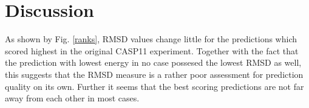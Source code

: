 \documentclass[11pt,a4paper]{article}
\renewcommand{\(}{\left (}
\renewcommand{\)}{\right )}
\begin{document}
\section{Discussion}
As shown by Fig. \ref{ranks}, RMSD values change little for the predictions which scored highest in the original CASP11 experiment. Together with the fact that the prediction with lowest energy in no case possesed the lowest RMSD as well, this suggests that the RMSD measure is a rather poor assessment for prediction quality on its own. Further it seems that the best scoring predictions are not far away from each other in most cases.\\

%



\end{document}
